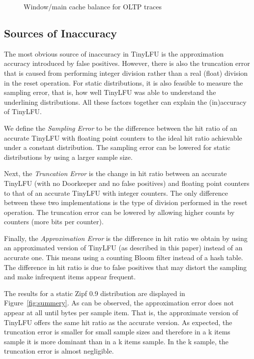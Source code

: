 \documentclass[10pt,a4paper]{article}
\begin{document}
\begin{figure}[t]
 	\caption{Window/main cache balance for OLTP traces}
 	\label{fig:oltpWindowCache}
\end{figure}



\subsection{Sources of Inaccuracy}
\label{sec:error}

The most obvious source of inaccuracy in TinyLFU is the approximation accuracy introduced by false positives.
However, there is also the truncation error that is caused from performing integer division rather than a real (float) division in the reset operation.
For static distributions, it is also feasible to measure the sampling error, that is, how well TinyLFU was able to understand the underlining distributions.
All these factors together can explain the (in)accuracy of TinyLFU.

We define the \emph{Sampling Error} to be the difference between the hit ratio of an accurate TinyLFU with floating point counters to the ideal hit ratio achievable under a constant distribution.
The sampling error can be lowered for static distributions by using a larger sample size.

Next, the \emph{Truncation Error} is the change in hit ratio between an accurate TinyLFU (with no Doorkeeper and no false positives) and floating point counters to that of an accurate TinyLFU with integer counters.
The only difference between these two implementations is the type of division performed in the reset operation.
The truncation error can be lowered by allowing higher counts by counters (more bits per counter).

Finally, the \emph{Approximation Error} is the difference in hit ratio we obtain by using an approximated version of TinyLFU (as described in this paper) instead of an accurate one.
This means using a counting Bloom filter instead of a hash table.
The difference in hit ratio is due to false positives that may distort the sampling and make infrequent items appear frequent.

The results for a static Zipf 0.9 distribution are displayed in Figure~\ref{fig:summery}.
As can be observed, the approximation error does not appear at all until  bytes per sample item.
That is, the approximate version of TinyLFU offers the same hit ratio as the accurate version.
As expected, the truncation error is smaller for small sample sizes and therefore in a k items sample it is more dominant than in a k items sample.
In the k sample, the truncation error is almost negligible.
\end{document}
